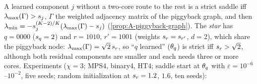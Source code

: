 A learned component $j$ without a two-core route to the rest is a strict saddle iff $\lambda_{\max}(\Gamma)>s_{j}$,
$\Gamma$ the weighted adjacency matrix of the piggyback graph, and then
$\lambda_{\min}=-s_{j}^{(K-2)/K}(\lambda_{\max}(\Gamma)-s_{j})$ \proven{} 
(\cref{prop:A-piggyback-graph}). The \emph{star} has $q=0000$ ($s_{q}=2$)
and $r=1010$, $r'=1001$ (weights $s_{r}=s_{r'}$, $d=2$), which share the piggyback node: $\lambda_{\max}(\Gamma)=\sqrt2\,s_{r}$,
so ``$q$ learned'' ($\theta_q$) is strict iff $s_{r}>\sqrt2$, although both residual components are smaller and
each needs three or more cores. Experiments ($\chi=3$; MPS4, binary4, HT4; saddle start at $\theta_q$ with
$\varepsilon=10^{-6}$--$10^{-2}$, five seeds; random initialization at $s_{r}=1.2$, $1.6$, ten seeds):
